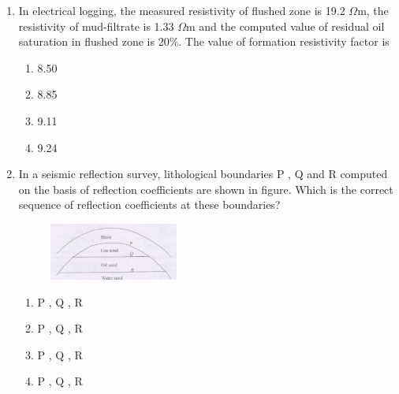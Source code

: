 \documentclass[journal,12pt,onecolumn]{IEEEtran}
\theoremstyle{remark}
\begin{document}
\begin{enumerate}
\newpage

    \item In electrical logging, the measured resistivity of flushed zone is 19.2 $\Omega$m, the resistivity of mud-filtrate is 1.33 $\Omega$m and the computed value of residual oil saturation in flushed zone is 20\%. The value of formation resistivity factor is

    \hfill{}
    
    \begin{multicols}{4}
        \begin{enumerate}
            \item 8.50
            \item 8.85
            \item 9.11
            \item 9.24
        \end{enumerate}
    \end{multicols}

    \item In a seismic reflection survey, lithological boundaries P , Q  and R  computed on the basis of reflection coefficients are shown in figure. Which is the correct sequence of reflection coefficients at these boundaries?

    \hfill{}
    
    \begin{figure}[h!]
        \centering
        \includegraphics[width=0.4\textwidth]{figs/fig2.png}
        \caption{}
        \label{fig:q70}
    \end{figure}
    
    \begin{multicols}{2}
        \begin{enumerate}
            \item P , Q , R 
            \item P , Q , R 
            \item P , Q , R 
            \item P , Q , R 
        \end{enumerate}
    \end{multicols}




\end{enumerate}
\end{document}
